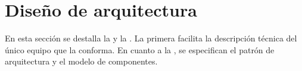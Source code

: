\section{\forlnameref Diseño de arquitectura}
\label{ref:architecture}

En esta sección se destalla la  y la . La primera facilita la descripción técnica del único equipo que la conforma. En cuanto a la , se especifican el patrón de arquitectura y el modelo de componentes.

